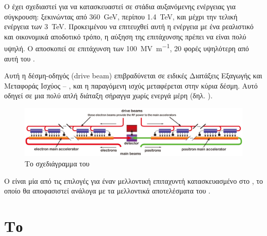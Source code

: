 Ο  έχει σχεδιαστεί για να κατασκευαστεί σε στάδια αυξανόμενης ενέργειας για σύγκρουση: ξεκινώντας από \SI{360}{\GeV}, περίπου \SI{1.4}{\TeV}, και μέχρι την τελική ενέργεια των \SI{3}{\TeV}. 
Προκειμένου να επιτευχθεί αυτή η ενέργεια με ένα ρεαλιστικό και οικονομικά αποδοτικό τρόπο, η αύξηση της επιτάχυνσης πρέπει να είναι πολύ υψηλή.
Ο  αποσκοπεί σε επιτάχυνση των \SI[per-mode = symbol]{100}{\mega \volt \per \metre}, 20 φορές υψηλότερη από αυτή του .

Αυτή η δέσμη-οδηγός (drive beam) επιβραδύνεται σε ειδικές Διατάξεις Εξαγωγής και Mεταφοράς Ισχύος -- , και η παραγόμενη  ισχύς μεταφέρεται στην κύρια δέσμη. 
Αυτό οδηγεί σε μια πολύ απλή διάταξη σήραγγα χωρίς ενεργά  μέρη (δηλ. ).

\begin{figure}[h]
\includegraphics[width=\textwidth]{images/CLIC-layout.jpg}
\centering
\caption{Το σχεδιάγραμμα του }
\label{CLIClayout}
\end{figure}

Ο  είναι μία από τις επιλογές για έναν μελλοντική επιταχυντή κατασκευασμένο στο , το οποίο θα αποφασιστεί ανάλογα με τα μελλοντικά αποτελέσματα του .

\section{Το }

